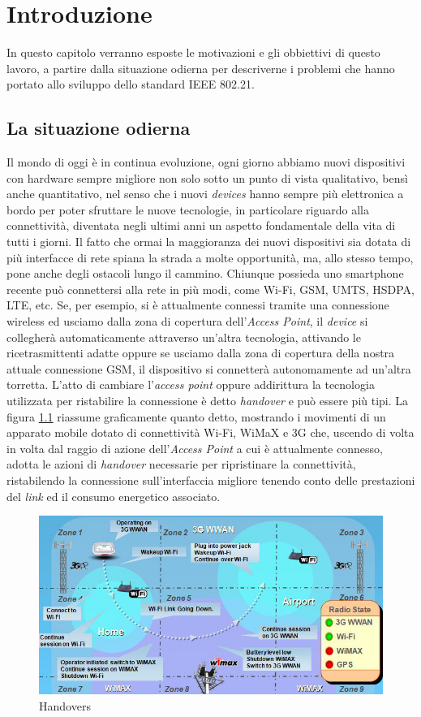 \chapter{Introduzione}
In questo capitolo verranno esposte le motivazioni e gli obbiettivi di questo lavoro, a partire dalla situazione odierna per descriverne i problemi che hanno portato allo sviluppo dello standard IEEE 802.21.

\section{La situazione odierna}
Il mondo di oggi è in continua evoluzione, ogni giorno abbiamo nuovi dispositivi con hardware sempre migliore non solo sotto un punto di vista qualitativo, bensì anche quantitativo, nel senso che i nuovi {\em devices} hanno sempre più elettronica a bordo per poter sfruttare le nuove tecnologie, in particolare riguardo alla connettività, diventata negli ultimi anni un aspetto fondamentale della vita di tutti i giorni. Il fatto che ormai la maggioranza dei nuovi dispositivi sia dotata di più interfacce di rete spiana la strada a molte opportunità, ma, allo stesso tempo, pone anche degli ostacoli lungo il cammino.
Chiunque possieda uno smartphone recente può connettersi alla rete in più modi, come Wi-Fi, GSM, UMTS, HSDPA, LTE, etc. Se, per esempio, si è attualmente connessi tramite una connessione wireless ed usciamo dalla zona di copertura dell'{\em Access Point}, il {\em device} si collegherà automaticamente attraverso un'altra tecnologia, attivando le ricetrasmittenti adatte oppure se usciamo dalla zona di copertura della nostra attuale connessione GSM, il dispositivo si connetterà autonomamente ad un'altra torretta. L'atto di cambiare l'{\em access point} oppure addirittura la tecnologia utilizzata per ristabilire la connessione è detto {\em handover} e può essere più tipi. La figura \ref{fig:handovers} riassume graficamente quanto detto, mostrando i movimenti di un apparato mobile dotato di connettività Wi-Fi, WiMaX e 3G che, uscendo di volta in volta dal raggio di azione dell'{\em Access Point} a cui è attualmente connesso, adotta le azioni di {\em handover} necessarie per ripristinare la connettività, ristabilendo la connessione sull'interfaccia migliore tenendo conto delle prestazioni del {\em link} ed il consumo energetico associato.

\begin{figure}[h!]
\centering
\includegraphics[scale=0.55]{handovers.jpg}
\caption{Handovers}
\label{fig:handovers}
\end{figure}


